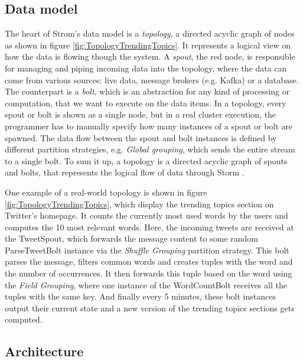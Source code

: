 \documentclass[conference]{IEEEtran}
\begin{document}
\subsection{Data model}

The heart of Strom's data model is a \emph{topology}, a directed acyclic graph of nodes as shown in figure \ref{fig:TopologyTrendingTopics}.
It represents a logical view on how the data is flowing though the system.
A \emph{spout}, the red node, is responsible for managing and piping incoming data into the topology, where the data can come from various sources: live data, message brokers (e.g. Kafka)  or a database.
The counterpart is a \emph{bolt}, which is an abstraction for any kind of processing or computation, that we want to execute on the data items.
In a topology, every spout or bolt is shown as a single node, but in a real cluster execution, the programmer has to manually specify how many instances of a spout or bolt are spawned.
The data flow between the spout and bolt instances is defined by different partition strategies, e.g. \emph{Global grouping}, which sends the entire stream to a single bolt.
To sum it up, a topology is a directed acyclic graph of spouts and bolts, that represents the logical flow of data through Storm \cite{StormTwitter}.

One example of a real-world topology is shown in figure \ref{fig:TopologyTrendingTopics}, which display the trending topics section on Twitter's homepage.
It counts the currently most used words by the users and computes the 10 most relevant words.
Here, the incoming tweets are received at the TweetSpout, which forwards the message content to some random ParseTweetBolt instance via the \emph{Shuffle Grouping} partition strategy.
This bolt parses the message, filters common words and creates tuples with the word and the number of occurrences.
It then forwards this tuple based on the word using the \emph{Field Grouping}, where one instance of the WordCountBolt receives all the tuples with the same key.
And finally every 5 minutes, these bolt instances output their current state and a new version of the trending topics sections gets computed.

\subsection{Architecture}
\end{document}
